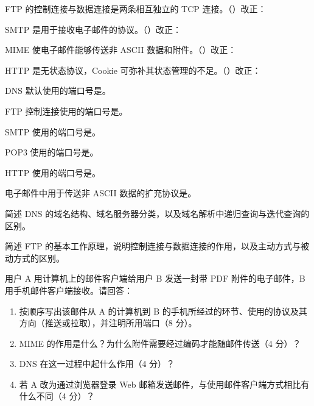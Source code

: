 \documentclass[a4paper,11pt]{article}
\begin{document}
\q FTP 的控制连接与数据连接是两条相互独立的 TCP 连接。\quad（\quad）\quad 改正：\fixblank

\q SMTP 是用于接收电子邮件的协议。\quad（\quad）\quad 改正：\fixblank

\q MIME 使电子邮件能够传送非 ASCII 数据和附件。\quad（\quad）\quad 改正：\fixblank

\q HTTP 是无状态协议，Cookie 可弥补其状态管理的不足。\quad（\quad）\quad 改正：\fixblank

\q DNS 默认使用的端口号是\fillblanks[1.4cm]。

\q FTP 控制连接使用的端口号是\fillblanks[1.4cm]。

\q SMTP 使用的端口号是\fillblanks[1.4cm]。

\q POP3 使用的端口号是\fillblanks[1.4cm]。

\q HTTP 使用的端口号是\fillblanks[1.4cm]。

\q 电子邮件中用于传送非 ASCII 数据的扩充协议是\fillblanks[1.8cm]。

\newpage
{}
\q 简述 DNS 的域名结构、域名服务器分类，以及域名解析中递归查询与迭代查询的区别。\anslines{5cm}

\q 简述 FTP 的基本工作原理，说明控制连接与数据连接的作用，以及主动方式与被动方式的区别。\anslines{5cm}

\q 用户 A 用计算机上的邮件客户端给用户 B 发送一封带 PDF 附件的电子邮件，B 用手机邮件客户端接收。请回答：
\begin{enumerate}[leftmargin=2em, itemsep=1pt, topsep=2pt]
  \item 按顺序写出该邮件从 A 的计算机到 B 的手机所经过的环节、使用的协议及其方向（推送或拉取），并注明所用端口（8 分）。
  \item MIME 的作用是什么？为什么附件需要经过编码才能随邮件传送（4 分）？
  \item DNS 在这一过程中起什么作用（4 分）？
  \item 若 A 改为通过浏览器登录 Web 邮箱发送邮件，与使用邮件客户端方式相比有什么不同（4 分）？
\end{enumerate}
\anslines{8cm}
\end{document}
